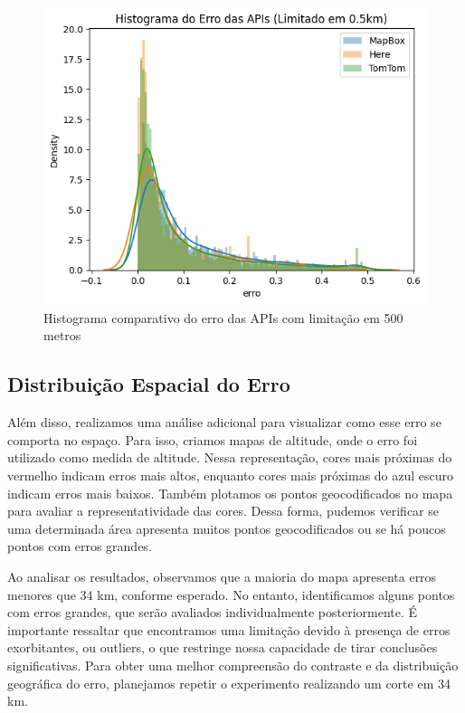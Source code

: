 \begin{figure}[h]
  \centering
  \includegraphics[width=\textwidth]{Figuras/hist5.png}
  \caption{Histograma comparativo do erro das APIs com limitação em 500 metros}
  \label{fig:hist5}
\end{figure}

\subsection{Distribuição Espacial do Erro}
Além disso, realizamos uma análise adicional para visualizar como esse erro se comporta no espaço. Para isso, criamos mapas de altitude, onde o erro foi utilizado como medida de altitude. Nessa representação, cores mais próximas do vermelho indicam erros mais altos, enquanto cores mais próximas do azul escuro indicam erros mais baixos. Também plotamos os pontos geocodificados no mapa para avaliar a representatividade das cores. Dessa forma, pudemos verificar se uma determinada área apresenta muitos pontos geocodificados ou se há poucos pontos com erros grandes.

Ao analisar os resultados, observamos que a maioria do mapa apresenta erros menores que 34 km, conforme esperado. No entanto, identificamos alguns pontos com erros grandes, que serão avaliados individualmente posteriormente. É importante ressaltar que encontramos uma limitação devido à presença de erros exorbitantes, ou outliers, o que restringe nossa capacidade de tirar conclusões significativas. Para obter uma melhor compreensão do contraste e da distribuição geográfica do erro, planejamos repetir o experimento realizando um corte em 34 km.

